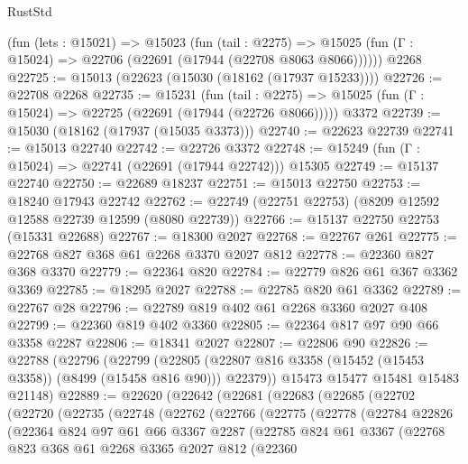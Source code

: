 \begin{lexlean}{RustStd}
\begin{coremodule}
    (fun (lets : @15021) =>
    @15023
      (fun (tail : @2275) =>
      @15025 (fun (Γ : @15024) => @22706 (@22691 (@17944 (@22708 @8063 @8066))))))
    @2268
@22725 := @15013 (@22623 (@15030 (@18162 (@17937 @15233))))
@22726 := @22708 @2268
@22735 := @15231
    (fun (tail : @2275) => @15025 (fun (Γ : @15024) => @22725 (@22691 (@17944 (@22726 @8066)))))
    @3372
@22739 := @15030 (@18162 (@17937 (@15035 @3373)))
@22740 := @22623 @22739
@22741 := @15013 @22740
@22742 := @22726 @3372
@22748 := @15249 (fun (Γ : @15024) => @22741 (@22691 (@17944 @22742))) @15305
@22749 := @15137 @22740
@22750 := @22689 @18237
@22751 := @15013 @22750
@22753 := @18240 @17943 @22742
@22762 := @22749 (@22751 @22753) (@8209 @12592 @12588 @22739 @12599 (@8080 @22739))
@22766 := @15137 @22750 @22753 (@15331 @22688)
@22767 := @18300 @2027
@22768 := @22767 @261
@22775 := @22768 @827 @368 @61 @2268 @3370 @2027 @812
@22778 := @22360 @827 @368 @3370
@22779 := @22364 @820
@22784 := @22779 @826 @61 @367 @3362 @3369
@22785 := @18295 @2027
@22788 := @22785 @820 @61 @3362
@22789 := @22767 @28
@22796 := @22789 @819 @402 @61 @2268 @3360 @2027 @408
@22799 := @22360 @819 @402 @3360
@22805 := @22364 @817 @97 @90 @66 @3358 @2287
@22806 := @18341 @2027
@22807 := @22806 @90
@22826 := @22788
    (@22796
      (@22799 (@22805 (@22807 @816 @3358 (@15452 (@15453 @3358)) (@8499 (@15458 @816 @90))) @22379))
      @15473
      @15477
      @15481
      @15483
      @21148)
@22889 := @22620
    (@22642
      (@22681
        (@22683
          (@22685
            (@22702
              (@22720
                (@22735
                  (@22748
                    (@22762
                      (@22766
                        (@22775
                          (@22778
                            (@22784
                              @22826
                              (@22364
                                @824
                                @97
                                @61
                                @66
                                @3367
                                @2287
                                (@22785
                                  @824
                                  @61
                                  @3367
                                  (@22768
                                    @823
                                    @368
                                    @61
                                    @2268
                                    @3365
                                    @2027
                                    @812
                                    (@22360

\end{coremodule}
\end{lexlean}
